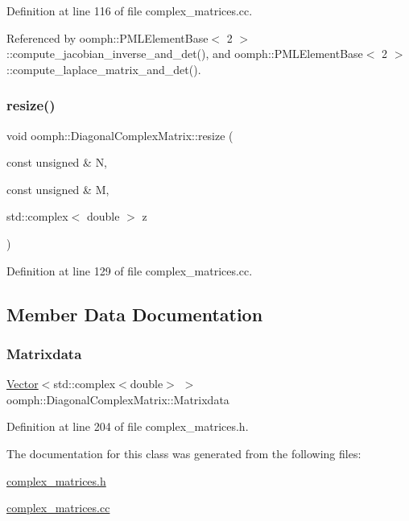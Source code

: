 Definition at line 116 of file complex\+\_\+matrices.\+cc.



Referenced by oomph\+::\+P\+M\+L\+Element\+Base$<$ 2 $>$\+::compute\+\_\+jacobian\+\_\+inverse\+\_\+and\+\_\+det(), and oomph\+::\+P\+M\+L\+Element\+Base$<$ 2 $>$\+::compute\+\_\+laplace\+\_\+matrix\+\_\+and\+\_\+det().

\mbox{\label{classoomph_1_1DiagonalComplexMatrix_a587ae9dc56b4e338f027dd29c241b197}} 
\subsubsection{\texorpdfstring{resize()}{resize()}\hspace{0.1cm}{\footnotesize\ttfamily [2/2]}}
{\footnotesize\ttfamily void oomph\+::\+Diagonal\+Complex\+Matrix\+::resize (\begin{DoxyParamCaption}\item[{const unsigned \&}]{N,  }\item[{const unsigned \&}]{M,  }\item[{std\+::complex$<$ double $>$}]{z }\end{DoxyParamCaption})}



Definition at line 129 of file complex\+\_\+matrices.\+cc.



\subsection{Member Data Documentation}
\mbox{\label{classoomph_1_1DiagonalComplexMatrix_aee732a6697a2217457763c5c14a6fb26}} 
\subsubsection{\texorpdfstring{Matrixdata}{Matrixdata}}
{\footnotesize\ttfamily \hyperlink{classoomph_1_1Vector}{Vector}$<$std\+::complex$<$double$>$ $>$ oomph\+::\+Diagonal\+Complex\+Matrix\+::\+Matrixdata\hspace{0.3cm}{\ttfamily [private]}}



Definition at line 204 of file complex\+\_\+matrices.\+h.



The documentation for this class was generated from the following files\+:\begin{DoxyCompactItemize}
\item 
\hyperlink{complex__matrices_8h}{complex\+\_\+matrices.\+h}\item 
\hyperlink{complex__matrices_8cc}{complex\+\_\+matrices.\+cc}\end{DoxyCompactItemize}
